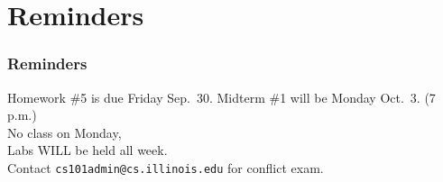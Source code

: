 \documentclass[11pt]{beamer}
\begin{document}
\section{Reminders}

\begin{frame}
  \frametitle{Reminders}
  \Enlarge

  \begin{itemize}
  \myitem  Homework \#5 is due Friday Sep.\ 30.
  \myitem  Midterm \#1 will be Monday Oct.\ 3.  (7 p.m.) \\ \textcolor{CS101GradBot}{No class on Monday, \\ Labs WILL be held all week. \\ Contact \texttt{cs101admin@cs.illinois.edu} for conflict exam.}
  \end{itemize}
\end{frame}
\end{document}
